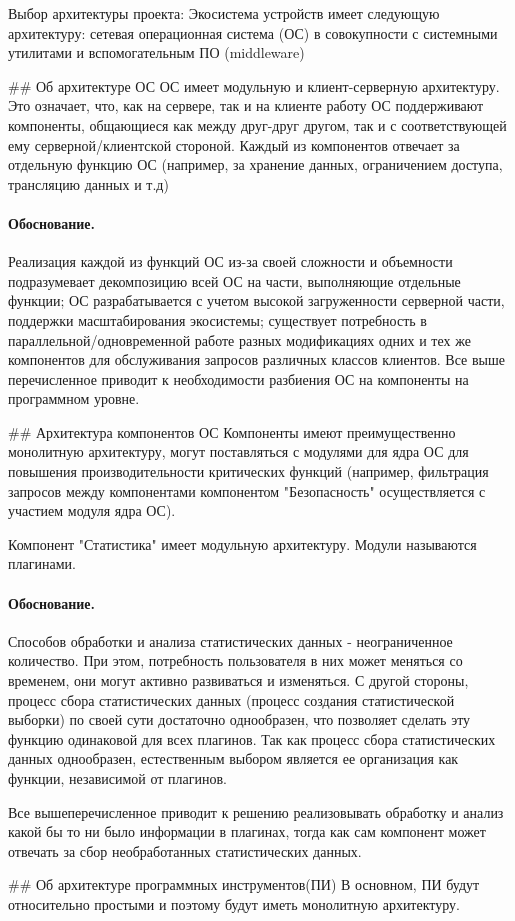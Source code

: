 Выбор архитектуры проекта:
Экосистема устройств имеет следующую архитектуру: сетевая операционная система (ОС) в совокупности с системными утилитами и вспомогательным ПО (middleware)

## Об архитектуре ОС
ОС имеет модульную и клиент-серверную архитектуру. Это означает, что, как на сервере, так и на клиенте работу ОС поддерживают компоненты, общающиеся как между друг-друг другом, так и с соответствующей ему серверной/клиентской стороной.
Каждый из компонентов отвечает за отдельную функцию ОС (например, за хранение данных, ограничением доступа, трансляцию данных и т.д)

\paragraph{Обоснование.} 
Реализация каждой из функций ОС из-за своей сложности и объемности подразумевает декомпозицию всей ОС на части, выполняющие отдельные функции; ОС разрабатывается с учетом высокой загруженности серверной части, поддержки масштабирования экосистемы; существует потребность в параллельной/одновременной работе разных модификациях одних и тех же компонентов для обслуживания запросов различных классов клиентов.
Все выше перечисленное приводит к необходимости разбиения ОС на компоненты на программном уровне.

## Архитектура компонентов ОС
Компоненты имеют преимущественно монолитную архитектуру, могут поставляться с модулями для ядра ОС для повышения производительности критических функций (например, фильтрация запросов между компонентами компонентом "Безопасность" осуществляется с участием модуля ядра ОС). 

Компонент "Статистика" имеет модульную архитектуру. Модули называются плагинами. 

\paragraph{Обоснование.} 
Способов обработки и анализа статистических данных - неограниченное количество. При этом, потребность пользователя в них может меняться со временем, они могут активно развиваться и изменяться.
С другой стороны, процесс сбора статистических данных (процесс создания статистической выборки) по своей сути достаточно однообразен, что позволяет сделать эту функцию одинаковой для всех плагинов. Так как процесс сбора статистических данных однообразен, естественным выбором является ее организация как функции, независимой от плагинов.

Все вышеперечисленное приводит к решению реализовывать обработку и анализ какой бы то ни было информации в плагинах, тогда как сам компонент может отвечать за сбор необработанных статистических данных.  

## Об архитектуре программных инструментов(ПИ)
В основном, ПИ будут относительно простыми и поэтому будут иметь монолитную архитектуру.
